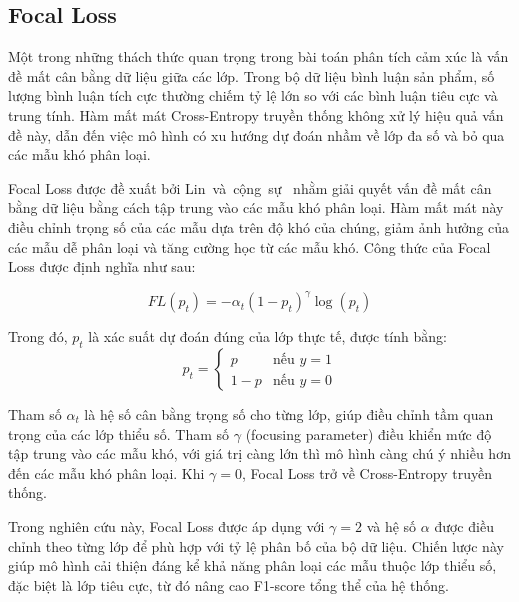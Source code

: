 \subsection{Focal Loss}

Một trong những thách thức quan trọng trong bài toán phân tích cảm xúc là vấn đề mất cân bằng dữ liệu giữa các lớp.
Trong bộ dữ liệu bình luận sản phẩm, số lượng bình luận tích cực thường chiếm tỷ lệ lớn so với các bình luận tiêu cực và trung tính.
Hàm mất mát Cross-Entropy truyền thống không xử lý hiệu quả vấn đề này, dẫn đến việc mô hình có xu hướng dự đoán nhầm về lớp đa số và bỏ qua các mẫu khó phân loại.

Focal Loss được đề xuất bởi Lin~và~cộng~sự~\cite{lin2017focal} nhằm giải quyết vấn đề mất cân bằng dữ liệu bằng cách tập trung vào các mẫu khó phân loại.
Hàm mất mát này điều chỉnh trọng số của các mẫu dựa trên độ khó của chúng, giảm ảnh hưởng của các mẫu dễ phân loại và tăng cường học từ các mẫu khó.
Công thức của Focal Loss được định nghĩa như sau:

\begin{equation}
FL(p_t) = -\alpha_t {(1 - p_t)}^{\gamma} \log(p_t)
\end{equation}

Trong đó, $p_t$ là xác suất dự đoán đúng của lớp thực tế, được tính bằng:
\begin{equation}
p_t = \begin{cases}
p & \text{nếu } y = 1 \\
1 - p & \text{nếu } y = 0
\end{cases}
\end{equation}

Tham số $\alpha_t$ là hệ số cân bằng trọng số cho từng lớp, giúp điều chỉnh tầm quan trọng của các lớp thiểu số.
Tham số $\gamma$ (focusing parameter) điều khiển mức độ tập trung vào các mẫu khó, với giá trị càng lớn thì mô hình càng chú ý nhiều hơn đến các mẫu khó phân loại.
Khi $\gamma = 0$, Focal Loss trở về Cross-Entropy truyền thống.

Trong nghiên cứu này, Focal Loss được áp dụng với $\gamma = 2$ và hệ số $\alpha$ được điều chỉnh theo từng lớp để phù hợp với tỷ lệ phân bố của bộ dữ liệu.
Chiến lược này giúp mô hình cải thiện đáng kể khả năng phân loại các mẫu thuộc lớp thiểu số, đặc biệt là lớp tiêu cực, từ đó nâng cao F1-score tổng thể của hệ thống.



